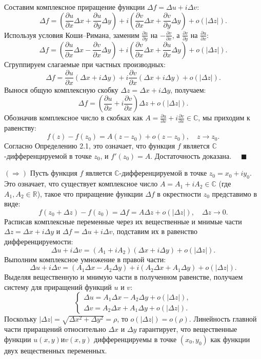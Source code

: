 \documentclass[12pt, a4paper]{article}
\theoremstyle{definition}
\theoremstyle{remark}
\begin{document}
Составим комплексное приращение функции $\Delta f = \Delta u + i \Delta v$:
\[
\Delta f = \left( \frac{\partial u}{\partial x}\Delta x + \frac{\partial u}{\partial y}\Delta y \right) + i \left( \frac{\partial v}{\partial x}\Delta x + \frac{\partial v}{\partial y}\Delta y \right) + o(|\Delta z|).
\]
Используя условия Коши–Римана, заменим $\frac{\partial u}{\partial y}$ на $-\frac{\partial v}{\partial x}$, а $\frac{\partial v}{\partial y}$ на $\frac{\partial u}{\partial x}$:
\[
\Delta f = \left( \frac{\partial u}{\partial x}\Delta x - \frac{\partial v}{\partial x}\Delta y \right) + i \left( \frac{\partial v}{\partial x}\Delta x + \frac{\partial u}{\partial x}\Delta y \right) + o(|\Delta z|).
\]
Сгруппируем слагаемые при частных производных:
\[
\Delta f = \frac{\partial u}{\partial x} (\Delta x + i\Delta y) + i \frac{\partial v}{\partial x} (\Delta x + i\Delta y) + o(|\Delta z|).
\]
Вынося общую комплексную скобку $\Delta z = \Delta x + i\Delta y$, получаем:
\[
\Delta f = \left( \frac{\partial u}{\partial x} + i \frac{\partial v}{\partial x} \right) \Delta z + o(|\Delta z|).
\]
Обозначив комплексное число в скобках как $A = \frac{\partial u}{\partial x} + i \frac{\partial v}{\partial x} \in \mathbb{C}$, мы приходим к равенству:
\[
f(z) - f(z_0) = A(z - z_0) + o(z - z_0), \quad z \to z_0.
\]
Согласно Определению 2.1, это означает, что функция $f$ является $\mathbb{C}$-дифференцируемой в точке $z_0$, и $f'(z_0) = A$. Достаточность доказана. $\quad \blacksquare$

$(\Rightarrow)$ Пусть функция $f$ является $\mathbb{C}$-дифференцируемой в точке $z_0 = x_0 + iy_0$. Это означает, что существует комплексное число $A = A_1 + iA_2 \in \mathbb{C}$ (где $A_1, A_2 \in \mathbb{R}$), такое что приращение функции $\Delta f$ в окрестности $z_0$ представимо в виде:
\[
f(z_0 + \Delta z) - f(z_0) = \Delta f = A \Delta z + o(|\Delta z|), \quad \Delta z \to 0.
\]
Расписав комплексные переменные через их вещественные и мнимые части $\Delta z = \Delta x + i\Delta y$ и $\Delta f = \Delta u + i \Delta v$, подставим их в равенство дифференцируемости:
\[
\Delta u + i \Delta v = (A_1 + iA_2)(\Delta x + i\Delta y) + o(|\Delta z|).
\]
Выполним комплексное умножение в правой части:
\[
\Delta u + i \Delta v = (A_1 \Delta x - A_2 \Delta y) + i(A_2 \Delta x + A_1 \Delta y) + o(|\Delta z|).
\]
Выделяя вещественную и мнимую части в полученном равенстве, получаем систему для приращений функций $u$ и $v$:
\[
\begin{cases}
	\Delta u = A_1 \Delta x - A_2 \Delta y + o(|\Delta z|), \\
	\Delta v = A_2 \Delta x + A_1 \Delta y + o(|\Delta z|).
\end{cases}
\]
Поскольку $|\Delta z| = \sqrt{\Delta x^2 + \Delta y^2} = \rho$, то $o(|\Delta z|) = o(\rho)$. Линейность главной части приращений относительно $\Delta x$ и $\Delta y$ гарантирует, что вещественные функции $u(x,y) и v(x,y)$ дифференцируемы в точке $(x_0, y_0)$ как функции двух вещественных переменных.
\end{document}
